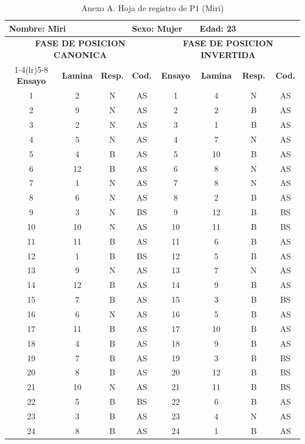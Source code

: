 \documentclass[stu, 12pt, letterpaper, donotrepeattitle, floatsintext, natbib]{apa7}
\begin{document}
\begin{table}[p]
\centering
\scriptsize
\caption{Anexo A. Hoja de registro de P1 (Miri)}
\label{anexo:p1}
\begin{tabular}{cccccccc}
\toprule
\multicolumn{3}{l}{\textbf{Nombre:} Miri} & \multicolumn{2}{l}{\textbf{Sexo:} Mujer} & \multicolumn{3}{l}{\textbf{Edad:} 23} \\
\midrule
\multicolumn{4}{c}{\textbf{FASE DE POSICION CANONICA}} & \multicolumn{4}{c}{\textbf{FASE DE POSICION INVERTIDA}} \\
\cmidrule(lr){1-4}\cmidrule(lr){5-8}
\textbf{Ensayo} & \textbf{Lamina} & \textbf{Resp.} & \textbf{Cod.} & \textbf{Ensayo} & \textbf{Lamina} & \textbf{Resp.} & \textbf{Cod.} \\
\midrule
1 & 2 & N & AS & 1 & 4 & N & AS \\
2 & 9 & N & AS & 2 & 2 & B & AS \\
3 & 2 & N & AS & 3 & 1 & B & AS \\
4 & 5 & N & AS & 4 & 7 & N & AS \\
5 & 4 & B & AS & 5 & 10 & B & AS \\
6 & 12 & B & AS & 6 & 8 & N & AS \\
7 & 1 & N & AS & 7 & 8 & N & AS \\
8 & 6 & N & AS & 8 & 2 & B & AS \\
9 & 3 & N & BS & 9 & 12 & B & BS \\
10 & 10 & N & AS & 10 & 11 & B & BS \\
11 & 11 & B & AS & 11 & 6 & B & AS \\
12 & 1 & B & BS & 12 & 5 & B & AS \\
13 & 9 & N & AS & 13 & 7 & N & AS \\
14 & 12 & B & AS & 14 & 9 & B & AS \\
15 & 7 & B & AS & 15 & 3 & B & BS \\
16 & 6 & N & AS & 16 & 5 & B & AS \\
17 & 11 & B & AS & 17 & 10 & B & AS \\
18 & 4 & B & AS & 18 & 9 & B & AS \\
19 & 7 & B & AS & 19 & 3 & B & BS \\
20 & 8 & B & AS & 20 & 12 & B & BS \\
21 & 10 & N & AS & 21 & 11 & B & BS \\
22 & 5 & B & BS & 22 & 6 & B & AS \\
23 & 3 & B & AS & 23 & 4 & N & AS \\
24 & 8 & B & AS & 24 & 1 & B & AS \\
\bottomrule
\end{tabular}
\end{table}
\end{document}
